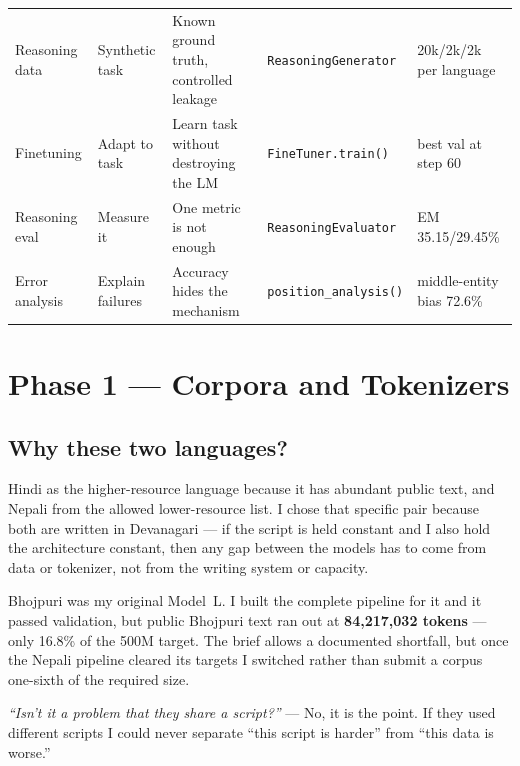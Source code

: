 \documentclass[11pt]{report}
\begin{document}
\begin{longtable}{@{}p{2.1cm}p{2.6cm}p{3.6cm}p{3.4cm}p{3.1cm}@{}}
Reasoning data & Synthetic task & Known ground truth, controlled leakage & \texttt{ReasoningGenerator} & 20k/2k/2k per language \\
Finetuning & Adapt to task & Learn task without destroying the LM & \texttt{FineTuner.train()} & best val at step 60 \\
Reasoning eval & Measure it & One metric is not enough & \texttt{ReasoningEvaluator} & EM 35.15/29.45\% \\
Error analysis & Explain failures & Accuracy hides the mechanism & \texttt{position\_analysis()} & middle-entity bias 72.6\% \\
\bottomrule
\end{longtable}

\chapter{Phase 1 --- Corpora and Tokenizers}

\section{Why these two languages?}

\begin{shortans}
Hindi as the higher-resource language because it has abundant public text, and
Nepali from the allowed lower-resource list. I chose that specific pair because
both are written in Devanagari --- if the script is held constant and I also
hold the architecture constant, then any gap between the models has to come
from data or tokenizer, not from the writing system or capacity.
\end{shortans}

\begin{deeper}
Bhojpuri was my original Model~L. I built the complete pipeline for it and it
passed validation, but public Bhojpuri text ran out at \textbf{84,217,032
tokens} --- only 16.8\% of the 500M target. The brief allows a documented
shortfall, but once the Nepali pipeline cleared its targets I switched rather
than submit a corpus one-sixth of the required size.
\end{deeper}

\begin{notebox}
\textit{``Isn't it a problem that they share a script?''} --- No, it is the
point. If they used different scripts I could never separate ``this script is
harder'' from ``this data is worse.''
\end{notebox}
\end{document}
